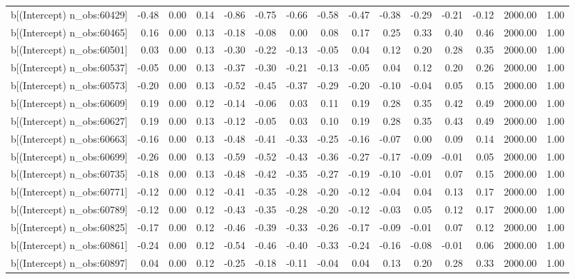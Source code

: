 \begin{table}[ht]
\begin{tabular}{rrrrrrrrrrrrrrr}
  b[(Intercept) n\_obs:60429] & -0.48 & 0.00 & 0.14 & -0.86 & -0.75 & -0.66 & -0.58 & -0.47 & -0.38 & -0.29 & -0.21 & -0.12 & 2000.00 & 1.00 \\ 
  b[(Intercept) n\_obs:60465] & 0.16 & 0.00 & 0.13 & -0.18 & -0.08 & 0.00 & 0.08 & 0.17 & 0.25 & 0.33 & 0.40 & 0.46 & 2000.00 & 1.00 \\ 
  b[(Intercept) n\_obs:60501] & 0.03 & 0.00 & 0.13 & -0.30 & -0.22 & -0.13 & -0.05 & 0.04 & 0.12 & 0.20 & 0.28 & 0.35 & 2000.00 & 1.00 \\ 
  b[(Intercept) n\_obs:60537] & -0.05 & 0.00 & 0.13 & -0.37 & -0.30 & -0.21 & -0.13 & -0.05 & 0.04 & 0.12 & 0.20 & 0.26 & 2000.00 & 1.00 \\ 
  b[(Intercept) n\_obs:60573] & -0.20 & 0.00 & 0.13 & -0.52 & -0.45 & -0.37 & -0.29 & -0.20 & -0.10 & -0.04 & 0.05 & 0.15 & 2000.00 & 1.00 \\ 
  b[(Intercept) n\_obs:60609] & 0.19 & 0.00 & 0.12 & -0.14 & -0.06 & 0.03 & 0.11 & 0.19 & 0.28 & 0.35 & 0.42 & 0.49 & 2000.00 & 1.00 \\ 
  b[(Intercept) n\_obs:60627] & 0.19 & 0.00 & 0.13 & -0.12 & -0.05 & 0.03 & 0.10 & 0.19 & 0.28 & 0.35 & 0.43 & 0.49 & 2000.00 & 1.00 \\ 
  b[(Intercept) n\_obs:60663] & -0.16 & 0.00 & 0.13 & -0.48 & -0.41 & -0.33 & -0.25 & -0.16 & -0.07 & 0.00 & 0.09 & 0.14 & 2000.00 & 1.00 \\ 
  b[(Intercept) n\_obs:60699] & -0.26 & 0.00 & 0.13 & -0.59 & -0.52 & -0.43 & -0.36 & -0.27 & -0.17 & -0.09 & -0.01 & 0.05 & 2000.00 & 1.00 \\ 
  b[(Intercept) n\_obs:60735] & -0.18 & 0.00 & 0.13 & -0.48 & -0.42 & -0.35 & -0.27 & -0.19 & -0.10 & -0.01 & 0.07 & 0.15 & 2000.00 & 1.00 \\ 
  b[(Intercept) n\_obs:60771] & -0.12 & 0.00 & 0.12 & -0.41 & -0.35 & -0.28 & -0.20 & -0.12 & -0.04 & 0.04 & 0.13 & 0.17 & 2000.00 & 1.00 \\ 
  b[(Intercept) n\_obs:60789] & -0.12 & 0.00 & 0.12 & -0.43 & -0.35 & -0.28 & -0.20 & -0.12 & -0.03 & 0.05 & 0.12 & 0.17 & 2000.00 & 1.00 \\ 
  b[(Intercept) n\_obs:60825] & -0.17 & 0.00 & 0.12 & -0.46 & -0.39 & -0.33 & -0.26 & -0.17 & -0.09 & -0.01 & 0.07 & 0.12 & 2000.00 & 1.00 \\ 
  b[(Intercept) n\_obs:60861] & -0.24 & 0.00 & 0.12 & -0.54 & -0.46 & -0.40 & -0.33 & -0.24 & -0.16 & -0.08 & -0.01 & 0.06 & 2000.00 & 1.00 \\ 
  b[(Intercept) n\_obs:60897] & 0.04 & 0.00 & 0.12 & -0.25 & -0.18 & -0.11 & -0.04 & 0.04 & 0.13 & 0.20 & 0.28 & 0.33 & 2000.00 & 1.00 \\ 

\end{tabular}
\end{table}
